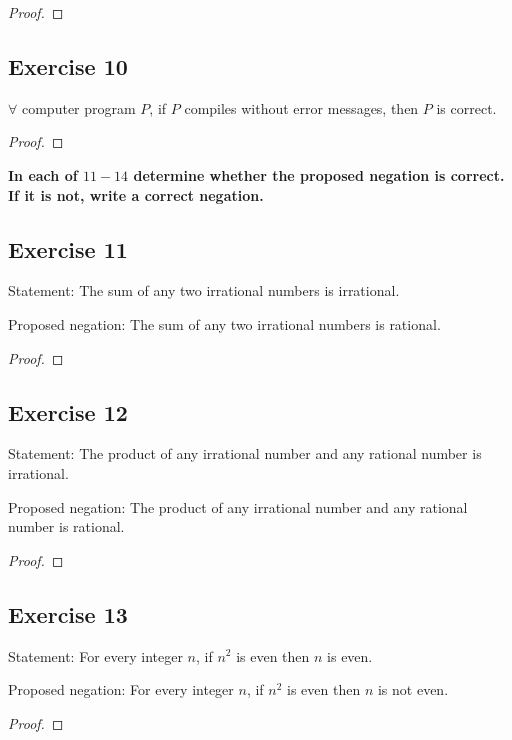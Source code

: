 \documentclass[14pt]{extarticle}
\newcommand{\fa}{\forall}
\begin{document}
\begin{proof}

\end{proof}

\subsection{Exercise 10}
$\fa$ computer program $P$, if $P$ compiles without error messages, then $P$ is correct.

\begin{proof}

\end{proof}

{\bf \color{cyan} In each of $11-14$ determine whether the proposed negation is correct. If it is not, write a correct negation.}

\subsection{Exercise 11}
Statement: The sum of any two irrational numbers is irrational.

Proposed negation: The sum of any two irrational numbers is rational.

\begin{proof}

\end{proof}

\subsection{Exercise 12}
Statement: The product of any irrational number and any rational number is irrational.

Proposed negation: The product of any irrational number and any rational number is rational.

\begin{proof}

\end{proof}

\subsection{Exercise 13}
Statement: For every integer $n$, if $n^2$ is even then $n$ is even.

Proposed negation: For every integer $n$, if $n^2$ is even then $n$ is not even.

\begin{proof}

\end{proof}
\end{document}
